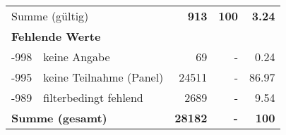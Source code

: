 \begin{longtable}{lXrrr}
     \midrule
     \multicolumn{2}{l}{Summe (gültig)} &
       \textbf{\num{913}} &
     \textbf{100} &
       \textbf{\num[round-mode=places,round-precision=2]{3,24}} \\
     \multicolumn{5}{l}{\textbf{Fehlende Werte}}\\
       -998 &
       keine Angabe &
         \num{69} &
        - &
         \num[round-mode=places,round-precision=2]{0,24} \\
       -995 &
       keine Teilnahme (Panel) &
         \num{24511} &
        - &
         \num[round-mode=places,round-precision=2]{86,97} \\
       -989 &
       filterbedingt fehlend &
         \num{2689} &
        - &
         \num[round-mode=places,round-precision=2]{9,54} \\
     \midrule
     \multicolumn{2}{l}{\textbf{Summe (gesamt)}} &
          \textbf{\num{28182}} &
        \textbf{-} &
        \textbf{100} \\
     \bottomrule
     \end{longtable}
     
